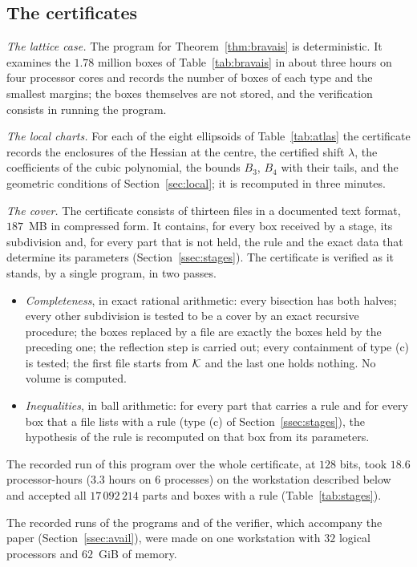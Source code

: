 \subsection{The certificates}\label{ssec:certs}

\emph{The lattice case.} The program for Theorem~\ref{thm:bravais} is deterministic. It examines the $1.78$ million boxes of
Table~\ref{tab:bravais} in about three hours on four processor cores and records the number of boxes of each type and the smallest
margins; the boxes themselves are not stored, and the verification consists in running the program.

\emph{The local charts.} For each of the eight ellipsoids of Table~\ref{tab:atlas} the certificate records the enclosures of the
Hessian at the centre, the certified shift $\lambda$, the coefficients of the cubic polynomial, the bounds $B_3$, $B_4$ with their
tails, and the geometric conditions of Section~\ref{sec:local}; it is recomputed in three minutes.

\emph{The cover.} The certificate consists of thirteen files in a documented text format, $187$~MB in compressed
form. It contains, for every box received by a stage, its subdivision and, for every part that is not held, the rule
and the exact data that determine its parameters (Section~\ref{ssec:stages}). The certificate is verified as it stands, by a
single program, in two passes.
\begin{itemize}
\item[(a)] \emph{Completeness}, in exact rational arithmetic: every bisection has both halves; every other subdivision
is tested to be a cover by an exact recursive procedure; the boxes replaced by a file are exactly the boxes held by the
preceding one; the reflection step is carried out; every containment of type (c) is tested; the first file starts from
$\mathcal K$ and the last one holds nothing. No volume is computed.
\item[(b)] \emph{Inequalities}, in ball arithmetic: for every part that carries a rule and for every box that a file lists
with a rule (type (c) of Section~\ref{ssec:stages}), the hypothesis of the rule is recomputed on that box from its parameters.
\end{itemize}
The recorded run of this program over the whole certificate, at $128$ bits, took $18.6$ processor-hours ($3.3$ hours on $6$
processes) on the workstation described below and accepted all $17\,092\,214$ parts and boxes with a rule
(Table~\ref{tab:stages}).

The recorded runs of the programs and of the verifier, which accompany the paper (Section~\ref{ssec:avail}), were made on one
workstation with $32$ logical processors and $62$~GiB of memory.

